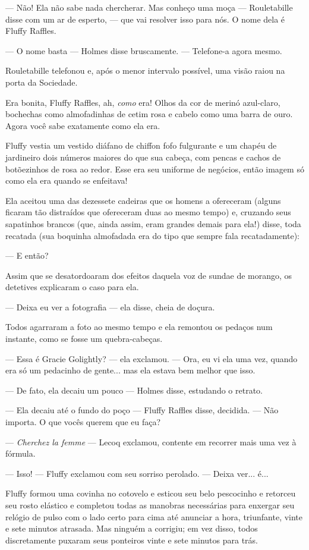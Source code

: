 --- Não! Ela não sabe nada chercherar. Mas conheço uma moça ---
Rouletabille disse com um ar de esperto, --- que vai resolver isso para
nós. O nome dela é Fluffy Raffles.

--- O nome basta --- Holmes disse bruscamente. --- Telefone-a agora
mesmo.

Rouletabille telefonou e, após o menor intervalo possível, uma visão
raiou na porta da Sociedade.

Era bonita, Fluffy Raffles, ah, \emph{como} era! Olhos da cor de merinó
azul-claro, bochechas como almofadinhas de cetim rosa e cabelo como uma
barra de ouro. Agora você sabe exatamente como ela era.

Fluffy vestia um vestido diáfano de chiffon fofo fulgurante e um chapéu
de jardineiro dois números maiores do que sua cabeça, com pencas e
cachos de botõezinhos de rosa ao redor. Esse era seu uniforme de
negócios, então imagem só como ela era quando se enfeitava!

Ela aceitou uma das dezessete cadeiras que os homens a ofereceram
(alguns ficaram tão distraídos que ofereceram duas ao mesmo tempo) e,
cruzando seus sapatinhos brancos (que, ainda assim, eram grandes demais
para ela!) disse, toda recatada (sua boquinha almofadada era do tipo que
sempre fala recatadamente):

--- E então?

Assim que se desatordoaram dos efeitos daquela voz de sundae de morango,
os detetives explicaram o caso para ela.

--- Deixa eu ver a fotografia --- ela disse, cheia de doçura.

Todos agarraram a foto ao mesmo tempo e ela remontou os pedaços num
instante, como se fosse um quebra-cabeças.

--- Essa é Gracie Golightly? --- ela exclamou. --- Ora, eu vi ela uma
vez, quando era só um pedacinho de gente... mas ela estava bem melhor
que isso.

--- De fato, ela decaiu um pouco --- Holmes disse, estudando o retrato.

--- Ela decaiu até o fundo do poço --- Fluffy Raffles disse, decidida.
--- Não importa. O que vocês querem que eu faça?

--- \emph{Cherchez la femme} --- Lecoq exclamou, contente em recorrer
mais uma vez à fórmula.

--- Isso! --- Fluffy exclamou com seu sorriso perolado. --- Deixa ver...
é...

Fluffy formou uma covinha no cotovelo e esticou seu belo pescocinho e
retorceu seu rosto elástico e completou todas as manobras necessárias
para enxergar seu relógio de pulso com o lado certo para cima até
anunciar a hora, triunfante, vinte e sete minutos atrasada. Mas ninguém
a corrigiu; em vez disso, todos discretamente puxaram seus ponteiros
vinte e sete minutos para trás.

